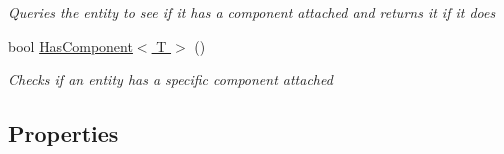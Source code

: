 \begin{DoxyCompactItemize}
\begin{DoxyCompactList}\small\item\em Queries the entity to see if it has a component attached and returns it if it does \end{DoxyCompactList}\item 
bool \hyperlink{class_m_b2_d_1_1_entity_component_1_1_entity_a8bbe196918b2eb4fe2102285c310ced3}{Has\+Component$<$ T $>$} ()
\begin{DoxyCompactList}\small\item\em Checks if an entity has a specific component attached \end{DoxyCompactList}\end{DoxyCompactItemize}
\subsection*{Properties}
